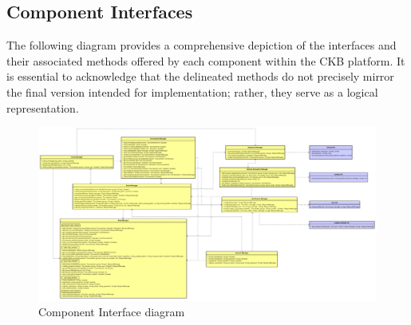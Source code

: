 \documentclass[../DD.tex]{subfiles}
\begin{document}
    \subsection{Component Interfaces}\label{subsec:component_interfaces}
    The following diagram provides a comprehensive depiction of the interfaces and their associated methods offered by each component within the CKB platform. 
    It is essential to acknowledge that the delineated methods do not precisely mirror the final version intended for implementation; rather, they serve as a logical representation.
    \begin{figure}[h]
        \centering
        \hspace*{-3cm}
        \includegraphics[width=1.4\textwidth]{../assets/section_2/interfacesDiagram.png}
        \caption{Component Interface diagram}
    \end{figure}
    \newpage
\end{document}
